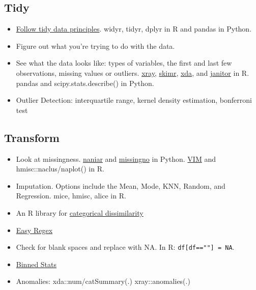 \documentclass[]{book}
\theoremstyle{definition}
\theoremstyle{definition}
\theoremstyle{definition}
\theoremstyle{remark}
\begin{document}
\subsection{Tidy}\label{tidy}

\begin{itemize}
\item
  \href{http://vita.had.co.nz/papers/tidy-data.pdf}{Follow tidy data
  principles}. widyr, tidyr, dplyr in R and pandas in Python.
\item
  Figure out what you're trying to do with the data.
\item
  See what the data looks like: types of variables, the first and last
  few observations, missing values or outliers.
  \href{https://blog.datascienceheroes.com/x-ray-vision-on-your-datasets/}{xray},
  \href{https://github.com/ropenscilabs/skimr}{skimr},
  \href{https://github.com/ujjwalkarn/xda}{xda}, and
  \href{https://cran.r-project.org/web/packages/janitor/vignettes/introduction.html}{janitor}
  in R. pandas and scipy.stats.describe() in Python.
\item
  Outlier Detection: interquartile range, kernel density estimation,
  bonferroni test
\end{itemize}

\subsection{Transform}\label{transform}

\begin{itemize}
\item
  Look at missingness.
  \href{https://github.com/njtierney/naniar}{naniar} and
  \href{https://github.com/ResidentMario/missingno}{missingno} in
  Python.
  \href{https://rstudio-pubs-static.s3.amazonaws.com/4625_fa990d611f024ea69e7e2b10dd228fe7.html}{VIM}
  and hmisc::naclus/naplot() in R.
\item
  Imputation. Options include the Mean, Mode, KNN, Random, and
  Regression. mice, hmisc, alice in R.
\item
  An R library for
  \href{https://www.rdocumentation.org/packages/StatMatch/versions/1.2.5/topics/gower.dist}{categorical
  dissimilarity}
\item
  \href{https://github.com/VerbalExpressions/PythonVerbalExpressions}{Easy
  Regex}
\item
  Check for blank spaces and replace with NA. In R:
  \texttt{df{[}df==""{]}\ =\ NA}.
\item
  \href{https://docs.scipy.org/doc/scipy-0.16.0/reference/generated/scipy.stats.binned_statistic.html}{Binned
  Stats}
\item
  Anomalies: xda::num/catSummary(.) \textbar{} xray::anomalies(.)
\end{itemize}
\end{document}
